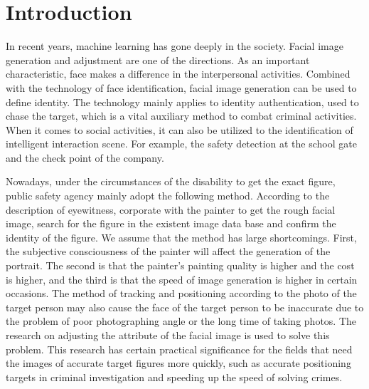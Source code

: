 \section{Introduction}

In recent years, machine learning has gone deeply in the society.
Facial image generation and adjustment are one of the directions.
As an important characteristic, face makes a difference in the interpersonal activities.
Combined with the technology of face identification, facial image generation can be used to define identity.
The technology mainly applies to identity authentication, used to chase the target, which is a vital auxiliary method to combat criminal activities.
When it comes to social activities, it can also be utilized to the identification of intelligent interaction scene.
For example, the safety detection at the school gate and the check point of the company.

Nowadays, under the circumstances of the disability to get the exact figure,
    public safety agency mainly adopt the following method.
According to the description of eyewitness, corporate with the painter to get the rough facial image,
    search for the figure in the existent image data base and confirm the identity of the figure.
We assume that the method has large shortcomings.
First, the subjective consciousness of the painter will affect the generation of the portrait.
    The second is that the painter's painting quality is higher and the cost is higher,
    and the third is that the speed of image generation is higher in certain occasions.
The method of tracking and positioning according to the photo of the target person may also cause the face of the target person to be inaccurate due to the problem of poor photographing angle or the long time of taking photos.
The research on adjusting the attribute of the facial image is used to solve this problem.
This research has certain practical significance for the fields that need the images of accurate target figures more quickly,
    such as accurate positioning targets in criminal investigation and speeding up the speed of solving crimes.